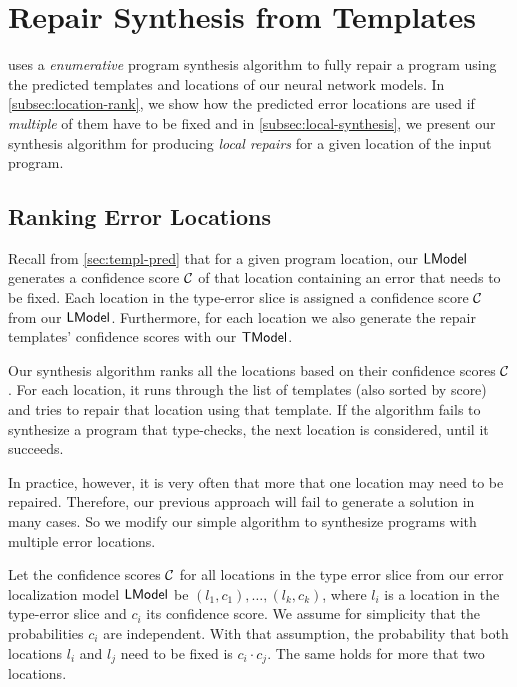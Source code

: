 \section{Repair Synthesis from Templates}
\label{sec:synthesis}
\toolname uses a \emph{enumerative} program synthesis algorithm to fully repair
a program using the predicted templates and locations of our neural network
models. In \autoref{subsec:location-rank}, we show how the predicted error
locations are used if \emph{multiple} of them have to be fixed and in
\autoref{subsec:local-synthesis}, we present our synthesis algorithm for
producing \emph{local repairs} for a given location of the input program.

\subsection{Ranking Error Locations}
\label{subsec:location-rank}

Recall from \autoref{sec:templ-pred} that for a given program location, our
$\mathsf{LModel}$ generates a confidence score $\mathcal{C}$ of that location containing an
error that needs to be fixed. Each location in the type-error slice is assigned
a confidence score $\mathcal{C}$ from our $\mathsf{LModel}$. Furthermore, for each location we
also generate the repair templates' confidence scores with our $\mathsf{TModel}$.

Our synthesis algorithm ranks all the locations based on their
confidence scores $\mathcal{C}$. For each location, it runs through the list
of templates (also sorted by score) and tries to repair that location using that
template. If the algorithm fails to synthesize a
program that type-checks, the next
location is considered, until it succeeds.

In practice, however, it is very often that more that one location may need to
be repaired. Therefore, our previous approach will fail to generate a solution
in many cases. So we modify our simple algorithm to synthesize programs with
multiple error locations.

Let the confidence scores $\mathcal{C}$ for all locations
in the type error slice from our error localization model $\mathsf{LModel}$ be
$(l_1, c_1), \dots, (l_k, c_k)$, where $l_i$ is a location in the type-error
slice and $c_i$ its confidence score. We assume for simplicity
that the probabilities $c_i$ are independent.
With that assumption, the probability that both locations $l_i$ and $l_j$
need to be fixed is $c_i \cdot c_j$. The same holds for more that two locations.

